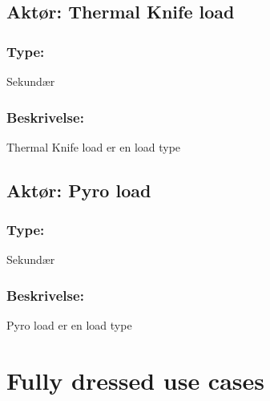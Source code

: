 \begin{framed}
	\subsection{Aktør: Thermal Knife load}
	\subsubsection*{Type:}
	Sekundær
	
	\subsubsection*{Beskrivelse:}
	Thermal Knife load er en load type
\end{framed}

\begin{framed}
	\subsection{Aktør: Pyro load}
	\subsubsection*{Type:}
	Sekundær
	
	\subsubsection*{Beskrivelse:}
	Pyro load er en load type
\end{framed}

\clearpage


\section{Fully dressed use cases}

